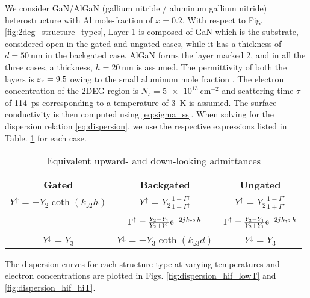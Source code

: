 We consider GaN/AlGaN (gallium nitride / aluminum gallium nitride)  heterostructure with Al mole-fraction of $x = \num[round-precision=1]{0.2}$. With respect to Fig. \ref{fig:2deg_structure_types}, Layer 1 is composed of GaN which is the substrate, considered open in the gated and ungated cases, while it has a thickness of $d = \SI{50}{\nm}$ in the backgated case. AlGaN forms the layer marked 2, and in all the three cases, a thickness, $h = \SI{20}{\nm}$ is assumed. The permittivity of both the layers is $\varepsilon_r = 9.5$ owing to the small aluminum mole fraction \cite{Muravjov2010}. The electron concentration of the 2DEG region is $N_s = \SI{5e13}{\cm^{-2}}$ and scattering time $\tau$ of \SI{114}{\ps} corresponding to a temperature of \SI{3}{\kelvin} is assumed. The surface conductivity is then computed using \eqref{eq:sigma_ss}. When solving for the dispersion relation \eqref{eq:dispersion}, we use the respective expressions listed in Table. \ref{tab:equations} for each case.
%
\begin{table}[!htbp]
\begin{center}
 \begin{tabular}{|c |c |c|}
 \hline
 Gated & Backgated  & Ungated \\ [0.5ex]
 \hline\hline
 $Y^{\uparrow} = - Y_{2} \coth (k_{z2} h)$ & $Y^{\uparrow} = Y_{2} \frac{1 - \Gamma^{\uparrow}}{1 + \Gamma^{\uparrow}}$ & $Y^{\uparrow} = Y_{2} \frac{1 - \Gamma^{\uparrow}}{1 + \Gamma^{\uparrow}}$ \\  & & \\ [2ex]
\num{} & $\Gamma^{\uparrow} = \frac{Y_2 - Y_1}{Y_2 + Y_1} \mathrm{e}^{-2{j}\mkern1mu k_{z2}\, h}$ & $\Gamma^{\uparrow} = \frac{Y_2 - Y_1}{Y_2 + Y_1} \mathrm{e}^{-2{j}\mkern1mu k_{z2}\, h}$ \\  & &  \\ [2ex]
 $Y^{\downarrow} = Y_{3}$ & $Y^{\downarrow} = - Y_{3} \coth (k_{z3} d)$ &  $Y^{\downarrow} = Y_{3}$ \\
 \hline
 \end{tabular}
  \end{center}
 \caption{Equivalent upward- and down-looking admittances}
 \label{tab:equations}
\end{table}
%
The dispersion curves for each structure type at varying temperatures and electron concentrations are plotted in Figs. \ref{fig:dispersion_hif_lowT} and \ref{fig:dispersion_hif_hiT}.
%
\begin{sidewaysfigure}
  \centering
  \caption{Dispersion curves plotted for a GaN/AlGaN heterostructure with $N_s = \SI{5e13}{\cm^{-2}}$ at \SI{3}{\kelvin} (a) Gated (b) Backgated (c) Ungated}
  \label{fig:dispersion_hif_lowT}
\end{sidewaysfigure}
